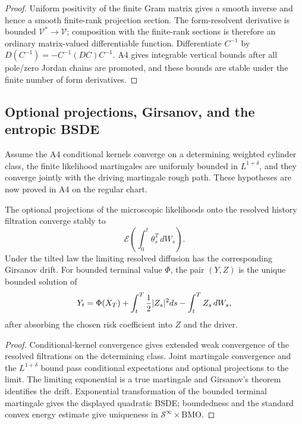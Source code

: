 \begin{proof}
Uniform positivity of the finite Gram matrix gives a smooth inverse and hence
a smooth finite-rank projection section.  The form-resolvent derivative is
bounded $\mathcal V^*\to\mathcal V$; composition with the finite-rank sections
is therefore an ordinary matrix-valued differentiable function.  Differentiate
$C^{-1}$ by $D(C^{-1})=-C^{-1}(DC)C^{-1}$.  A4 gives integrable vertical
bounds after all pole/zero Jordan chains are promoted, and these bounds are
stable under the finite number of form derivatives.
\end{proof}

\subsection{Optional projections, Girsanov, and the entropic BSDE}

Assume the A4 conditional kernels converge on a determining weighted cylinder
class, the finite likelihood martingales are uniformly bounded in
$L^{1+\delta}$, and they converge jointly with the driving martingale rough
path.  These hypotheses are now proved in A4 on the regular chart.

\begin{theorem}
\label{thm:r13-c2-filter}
The optional projections of the microscopic likelihoods onto the resolved
history filtration converge stably to
\[
 \mathcal E\left(\int_0^t\theta_s^T\,dW_s\right).
\]
Under the tilted law the limiting resolved diffusion has the corresponding
Girsanov drift.  For bounded terminal value $\Phi$, the pair
$(Y,Z)$ is the unique bounded solution of
\[
 Y_t=\Phi(X_T)+\int_t^T{1\over2}|Z_s|^2ds
      -\int_t^TZ_s\,dW_s,
\]
after absorbing the chosen risk coefficient into $Z$ and the driver.
\end{theorem}

\begin{proof}
Conditional-kernel convergence gives extended weak convergence of the
resolved filtrations on the determining class.  Joint martingale convergence
and the $L^{1+\delta}$ bound pass conditional expectations and optional
projections to the limit.  The limiting exponential is a true martingale and
Girsanov's theorem identifies the drift.  Exponential transformation of the
bounded terminal martingale gives the displayed quadratic BSDE; boundedness
and the standard convex energy estimate give uniqueness in
$\mathcal S^\infty\times\mathrm{BMO}$.
\end{proof}

